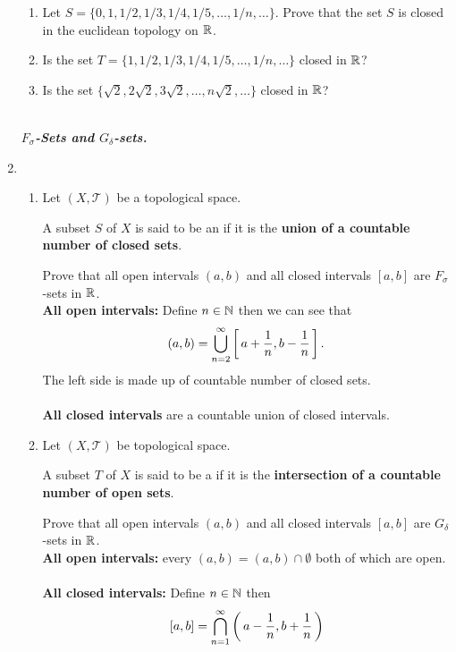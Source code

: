 \documentclass[10pt,a4paper]{report}
\newcommand{\SPECIAL}[1]{\begin{center}
	{\Large \textbf{\textit{\\#1}} }
\end{center}
}
\newcommand{\TT}{\mathcal{T}}
\begin{document}
\begin{enumerate}
\begin{enumerate}[label=(\roman*)]
	\item Let $S=\{0,1,1/2,1/3,1/4,1/5, \dots, 1/n, \dots\}$.  Prove that the set $S$ is closed in the euclidean topology on $\mathbb{R}$.
	
	\item Is the set $T=\{1,1/2,1/3,1/4,1/5,\dots,1/n, \dots\}$ closed in $\mathbb{R}$?
	
	\item Is the set $\{\sqrt{2}, 2\sqrt{2},3\sqrt{2},\dots, n\sqrt{2}, \dots\}$ closed in $\mathbb{R}$?

\end{enumerate}
	
	\SPECIAL{$F_\sigma$-Sets and $G_\delta$-sets.}

\item \begin{enumerate}[label=(\roman*)]

	\item Let $(X, \TT)$ be a topological space.  \begin{center} A subset $S$ of $X$ is said to be an  if it is the \textbf{union of a countable number of closed sets}.\end{center} Prove that all open intervals $(a,b)$ and all closed intervals $[a,b]$ are $F_\sigma$-sets in $\mathbb{R}$.\\
	
	\textbf{All open intervals:} Define $n \in \mathbb{N}$ then we can see that \[ (a,b) = \bigcup_{n=2}^\infty \left [\, a+\frac{1}{n}, b-\frac{1}{n} \,\right ].\] The left side is made up of countable number of closed sets.\\
	\\
	\textbf{All closed intervals} are a countable union of closed intervals.\\
	
	\item Let $(X, \TT)$ be topological space.  \begin{center}A subset $T$ of $X$ is said to be a  if it is the \textbf{intersection of a countable number of open sets}.\end{center}  Prove that all open intervals $(a,b)$ and all closed intervals	 $[a,b]$ are $G_\delta$-sets in $\mathbb{R}$.\\
	
	\textbf{All open intervals:} every $(a,b)=(a,b) \cap \emptyset$ both of which are open.\\
	\\
	\textbf{All closed intervals:} Define $n\in \mathbb{N}$ then \[ [a,b] = \bigcap_{n=1}^\infty \left (\, a-\frac{1}{n}, b+\frac{1}{n} \,\right )\]\\
	

\end{enumerate}
\end{enumerate}
\end{document}
